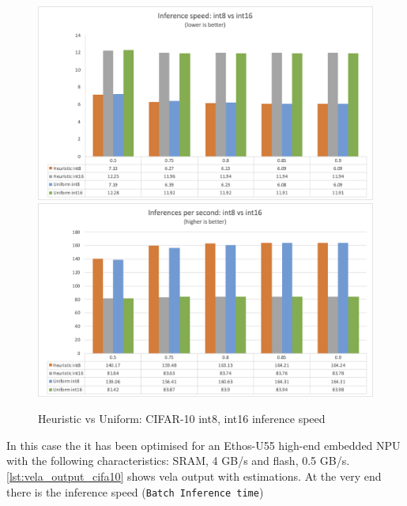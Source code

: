 \begin{figure}
    \centering
    {\includegraphics[width=1\linewidth]{images/results/cifar10_inf_speed.png}}
    {\includegraphics[width=1\linewidth]{images/results/cifar10_infs_second.png}}
    \caption{Heuristic vs Uniform: CIFAR-10 int8, int16 inference speed}\label{fig:cifar10_inf_speed}
\end{figure}

In this case the it has been optimised for an Ethos-U55 high-end embedded NPU
with the following characteristics: SRAM, 4 GB/s and flash, 0.5 GB/s.
\autoref{lst:vela_output_cifa10} shows vela output with estimations. At the very end
there is the inference speed (\texttt{Batch Inference time})

